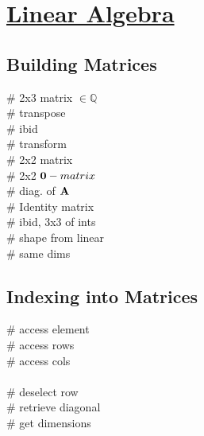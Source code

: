 \section{\href{https://docs.julialang.org/en/v1/stdlib/LinearAlgebra/}{Linear Algebra}}

\subsection*{Building Matrices}
\mycolX{35mm}{\code{[1. 2. 3.; 4. 5. 6.]}} \# 2x3 matrix $\in \mathbb{Q}$\\
 \# transpose \\
 \# ibid \\ 
 \# transform \\  \# 2x2 matrix \\
 \# 2x2 $\mathbf{0}-matrix$\\
 \# diag. of $\mathbf{A}$\\
 \# Identity matrix\\
 \# ibid, 3x3 of ints\\
 \# shape from linear \\
 \# same dims \\

\subsection*{Indexing into Matrices}
 \# access element \\
 \# access rows \\
 \# access cols \\
\\ \# deselect row \\
 \# retrieve diagonal \\
 \# get dimensions \\



